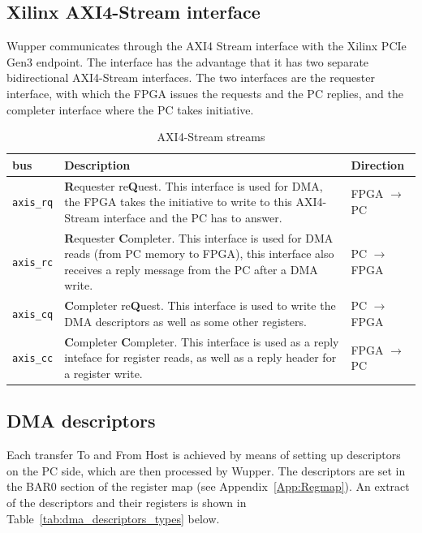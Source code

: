 \subsection{Xilinx AXI4-Stream interface}
Wupper communicates through the AXI4 Stream interface with the Xilinx PCIe Gen3 endpoint. 
The interface has the advantage that it has two separate bidirectional AXI4-Stream interfaces. The two interfaces are the requester interface, with which the FPGA issues the requests and the PC replies, and the completer interface where the PC takes initiative.
\begin{table}[H]
	\centering
	\begin{tabularx}{\textwidth}{|l|X|l|}
		\hline
		\textbf{bus} & \textbf{Description} &\textbf{Direction}\\
		\hline
		\texttt{axis\_rq} & \textbf{R}equester re\textbf{Q}uest. This interface is used for DMA, the FPGA takes the initiative to write to this AXI4-Stream interface and the PC has to answer. &FPGA $\rightarrow$ PC\\
		\hline
		\texttt{axis\_rc} & \textbf{R}equester \textbf{C}ompleter. This interface is used for DMA reads (from PC memory to FPGA), this interface also receives a reply message from the PC after a DMA write.&PC $\rightarrow$ FPGA\\
		\hline
		\texttt{axis\_cq} & \textbf{C}ompleter re\textbf{Q}uest. This interface is used to write the DMA descriptors as well as some other registers. & PC $\rightarrow$ FPGA\\
		\hline
		\texttt{axis\_cc} & \textbf{C}ompleter \textbf{C}ompleter. This interface is used as a reply inteface for register reads, as well as a reply header for a register write. & FPGA $\rightarrow$ PC\\
		\hline
		
	\end{tabularx}
	\caption{AXI4-Stream streams}\label{tab:axi_streams}
\end{table}


\newpage
\subsection{DMA descriptors}
\label{sec:dma_descriptors}
Each transfer To and From Host is achieved by means of setting up descriptors on the PC side, which are then processed by Wupper.
The descriptors are set in the BAR0 section of the register map (see Appendix~\ref{App:Regmap}). An extract of the descriptors and their registers is shown in Table~\ref{tab:dma_descriptors_types} below.

